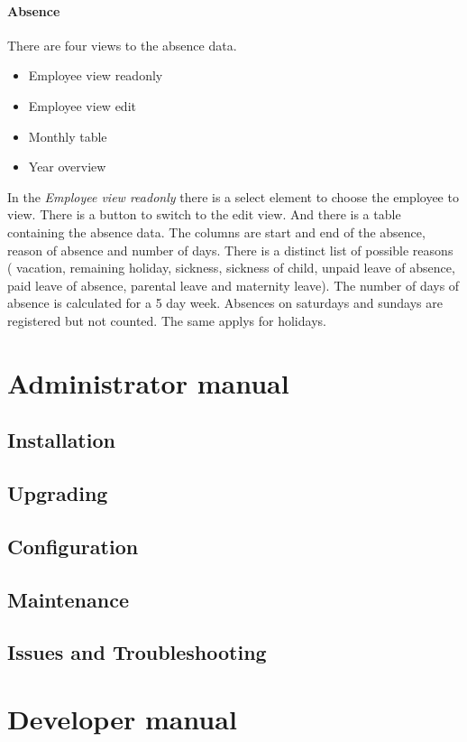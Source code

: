 \documentclass[12pt,a4paper,titlepage]{book}
\begin{document}
\subsubsection{Absence}
There are four views to the absence data.
\begin{itemize}
\item Employee view readonly
\item Employee view edit
\item Monthly table
\item Year overview
\end{itemize}
In the \emph{Employee view readonly} there is a select element to choose the employee to view. There is a button to switch to the edit view.
And there is a table containing the absence data. The columns are start and end of the absence, reason of absence and number of days.
There is a distinct list of possible reasons ( vacation,
        remaining holiday,
       sickness,
        sickness of child,
        unpaid leave of absence,
        paid leave of absence,
        parental leave and
        maternity leave).
The number of days of absence is calculated for a 5 day week. Absences on saturdays and sundays are registered but not counted. The same applys for holidays.


\chapter{Administrator manual}
\section{Installation}
\section{Upgrading}
\section{Configuration}
\section{Maintenance}
\section{Issues and Troubleshooting}


\chapter{Developer manual}
\end{document}
